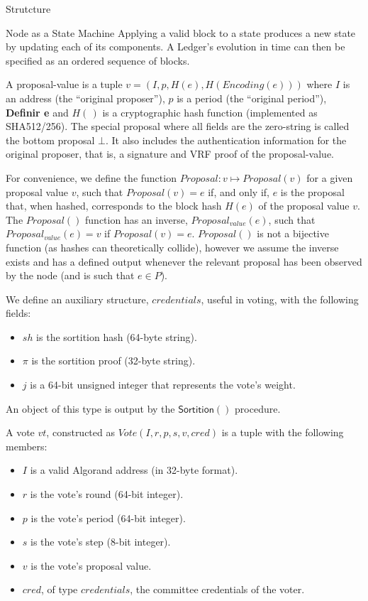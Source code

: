 \documentclass[10pt,a4paper]{article}
\begin{document}
\begin{section}{Strutcture}
\begin{subsection}{Node as a State Machine}
Applying a valid block to a state produces a new state by updating each of its components.
A Ledger's evolution in time can then be specified as an ordered sequence of blocks.

A proposal-value is a tuple $v = (I, p, H(e), H(Encoding(e)))$ where 
$I$ is an address (the ``original proposer''), 
$p$ is a period (the ``original period''), 
{\bf Definir e}
and
$H(\,)$ is a cryptographic hash function (implemented as SHA512/256). 
The special proposal where all fields are the zero-string is called the bottom 
proposal $\bot$. 
It also includes the authentication information for the original proposer, that is, 
a signature and VRF proof of the proposal-value.


For convenience, we define the function $Proposal:v\mapsto{Proposal}(v)$ for a given proposal value 
$v$,  such that $Proposal(v) = e$ if, and only if, $e$ is the proposal that, when hashed, corresponds 
to the block hash $H(e)$ of the proposal value $v$. 
The $Proposal()$ function has an inverse, $Proposal_{value}(e)$, such that
$Proposal_{value}(e) = v$ if $Proposal(v) = e$.
$Proposal()$ is not a bijective function (as hashes can theoretically collide), however we assume the inverse
exists and has a defined output whenever the relevant proposal has been observed by the node
(and is such that $e \in P$).



We define an auxiliary structure, $credentials$, useful in voting, with the following fields:
\begin{itemize}
    \item $sh$ is the sortition hash (64-byte string).
    \item $\pi$ is the sortition proof (32-byte string).
    \item $j$ is a 64-bit unsigned integer that represents the vote's weight.
\end{itemize}
An object of this type is output by the $\mathsf{Sortition}()$ procedure.

A vote $vt$, constructed as $Vote(I,r,p,s,v,cred)$ is a tuple with the following members:
\begin{itemize}
    \item $I$ is a valid Algorand address (in 32-byte format).
    \item $r$ is the vote's round (64-bit integer).
    \item $p$ is the vote's period (64-bit integer).
    \item $s$ is the vote's step (8-bit integer).
    \item $v$ is the vote's proposal value.
    \item $cred$, of type $credentials$, the committee credentials of the voter.
\end{itemize}


\end{subsection}
\end{section}
\end{document}
